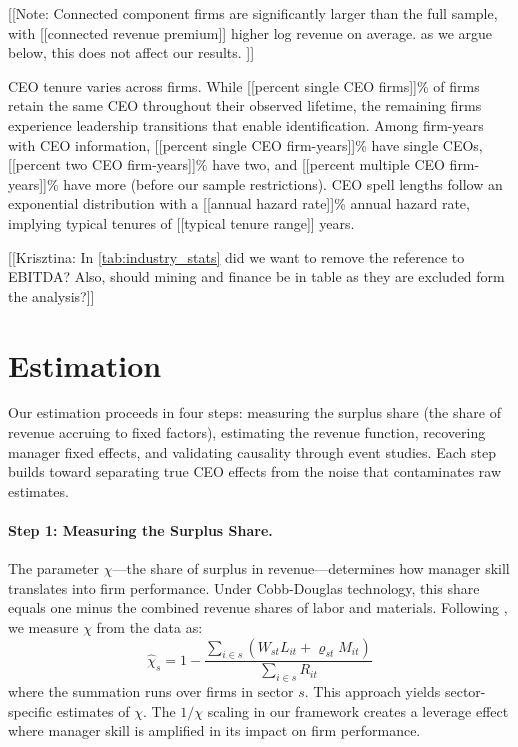 \documentclass[11pt,a4paper]{article}
\begin{document}
[[Note: Connected component firms are significantly larger than the full sample, with [[connected revenue premium]] higher log revenue on average. as we argue below, this does not affect our results. ]]

CEO tenure varies across firms. While [[percent single CEO firms]]\% of firms retain the same CEO throughout their observed lifetime, the remaining firms experience leadership transitions that enable identification. Among firm-years with CEO information, [[percent single CEO firm-years]]\% have single CEOs, [[percent two CEO firm-years]]\% have two, and [[percent multiple CEO firm-years]]\% have more (before our sample restrictions). CEO spell lengths follow an exponential distribution with a [[annual hazard rate]]\% annual hazard rate, implying typical tenures of [[typical tenure range]] years.




[[Krisztina: In \ref{tab:industry_stats} did we want to remove the reference to EBITDA? Also, should mining and finance be in table as they are excluded form the analysis?]]

\section{Estimation}

Our estimation proceeds in four steps: measuring the surplus share (the share of revenue accruing to fixed factors), estimating the revenue function, recovering manager fixed effects, and validating causality through event studies. Each step builds toward separating true CEO effects from the noise that contaminates raw estimates.

\paragraph{Step 1: Measuring the Surplus Share.} The parameter $\chi$---the share of surplus in revenue---determines how manager skill translates into firm performance. Under Cobb-Douglas technology, this share equals one minus the combined revenue shares of labor and materials. Following \citet{Gandhi2020-nu}, we measure $\chi$ from the data as:
\begin{equation}
\hat{\chi}_s = 1 - \frac{\sum_{i \in s}(W_{st}L_{it} + \varrho_{st}M_{it})}{\sum_{i \in s} R_{it}}
\end{equation}
where the summation runs over firms in sector $s$. This approach yields sector-specific estimates of $\chi$. The $1/\chi$ scaling in our framework creates a leverage effect where manager skill is amplified in its impact on firm performance.
\end{document}

